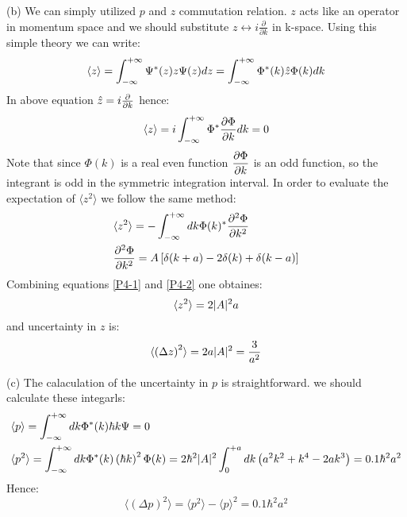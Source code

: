 \begin{homeworkProblem}
\begin{homeworkSection}{(b)}
  We can simply utilized $p$ and $z$ commutation relation. $z$ acts like an operator in momentum space and we should substitute $z\leftrightarrow i\frac{\partial}{\partial k}$ in k-space. Using this simple theory we can write:
\begin{equation}
\langle z\rangle=\int_{-\infty}^{+\infty}\Psi^*(z)z\Psi(z) dz=\int_{-\infty}^{+\infty}\Phi^*(k)\Hat{z}\Phi(k)dk
\end{equation} 
In above equation $\Hat{z}=i\frac{\partial}{\partial k}$ hence:
\begin{equation}
\langle z\rangle=i\int_{-\infty}^{+\infty}\Phi^*\dfrac{\partial \Phi}{\partial k}dk=0
\end{equation}
Note that since $\Phi(k)$ is a real even function $\dfrac{\partial \Phi}{\partial k}$ is an odd function, so the integrant is odd  in the symmetric integration interval. In order to evaluate the expectation of $\langle z^2\rangle$ we follow the same method:
\begin{align}
&\langle z^2\rangle=-\int_{-\infty}^{+\infty}dk\Phi(k)^*\dfrac{\partial^2 {\Phi}}{\partial {k}^2}\label{P4-1}\\
&\dfrac{\partial^2 {\Phi}}{\partial {k}^2}=A\left[\delta(k+a)-2\delta(k)+\delta(k-a)\right]\label{P4-2}
\end{align}
Combining equations \eqref{P4-1} and \eqref{P4-2} one obtaines:
\begin{equation}
\langle z^2\rangle=2\lvert A\rvert^2a
\end{equation}
and uncertainty in $z$ is:
\begin{equation}
\langle\left(\Delta z\right)^2\rangle= 2a\lvert A\rvert^2=\frac{3}{a^2}
\end{equation}

\end{homeworkSection}

\begin{homeworkSection}{(c)}
 The calaculation of the uncertainty in $p$ is straightforward. we should calculate these integarls:
\begin{align}
&\langle p\rangle=\int_{-\infty}^{+\infty}dk \Phi^*(k)\hbar k\Psi=0\\
&\langle p^2\rangle =\int_{-\infty}^{+\infty}dk \Phi^*(k)\left(\hbar k\right)^2\Phi(k)=2\hbar^2\lvert A\rvert^2\int_{0}^{+a}dk\left(a^2k^2+k^4-2ak^3\right)=0.1\hbar^2a^2
\end{align} 
Hence:
\begin{equation}
\langle\left(\Delta p\right)^2\rangle=\langle p^2\rangle-\langle p\rangle^2= 0.1\hbar^2 a^2
\end{equation}


\end{homeworkSection}



\end{homeworkProblem}
